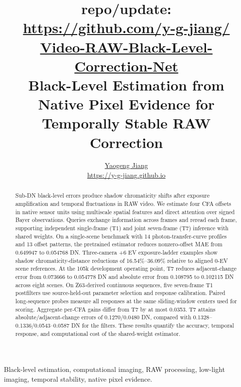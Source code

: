 

\title{{\small\ttfamily repo/update: \href{https://github.com/y-g-jiang/Video-RAW-Black-Level-Correction-Net}{https://github.com/y-g-jiang/}\\\href{https://github.com/y-g-jiang/Video-RAW-Black-Level-Correction-Net}{Video-RAW-Black-Level-Correction-Net}}\\[0.8em]Black-Level Estimation from Native Pixel Evidence for Temporally Stable RAW Correction}
\author{\href{https://y-g-jiang.github.io}{Yaogeng Jiang}\\\url{https://y-g-jiang.github.io}}
\maketitle
\begin{abstract}
Sub-DN black-level errors produce shadow chromaticity shifts after exposure amplification and temporal fluctuations in RAW video. We estimate four CFA offsets in native sensor units using multiscale spatial features and direct attention over signed Bayer observations. Queries exchange information across frames and reread each frame, supporting independent single-frame (T1) and joint seven-frame (T7) inference with shared weights. On a single-scene benchmark with 14 photon-transfer-curve profiles and 13 offset patterns, the pretrained estimator reduces nonzero-offset MAE from 0.649947 to 0.054768 DN. Three-camera +6 EV exposure-ladder examples show shadow chromaticity-distance reductions of 16.54\%--36.09\% relative to aligned 0-EV scene references. At the 105k development operating point, T7 reduces adjacent-change error from 0.073666 to 0.054778 DN and absolute error from 0.108795 to 0.102115 DN across eight scenes. On Z63-derived continuous sequences, five seven-frame T1 postfilters use source-held-out parameter selection and response calibration. Paired long-sequence probes measure all responses at the same sliding-window centers used for scoring. Aggregate per-CFA gains differ from T7 by at most 0.0353. T7 attains absolute/adjacent-change errors of 0.1270/0.0480 DN, compared with 0.1328--0.1336/0.0543--0.0587 DN for the filters. These results quantify the accuracy, temporal response, and computational cost of the shared-weight estimator.
\end{abstract}
\begin{IEEEkeywords}
Black-level estimation, computational imaging, RAW processing, low-light imaging, temporal stability, native pixel evidence.
\end{IEEEkeywords}

